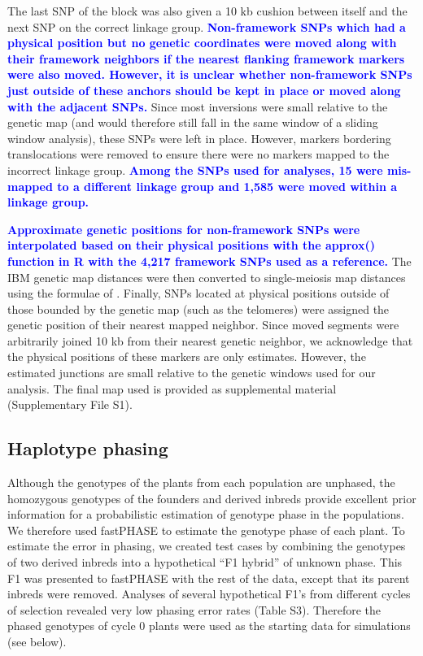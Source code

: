 \documentclass[twocolumn,twoside,letterpaper]{article}
\newcommand{\jpg}[1]{\todo[size=\scriptsize, color=gerkegreen]{#1}}
\newcommand{\rev}[1]{\textcolor{blue}{\bf #1}}
\begin{document}
The last SNP of the block was also given a 10 kb cushion between itself and the next SNP on the correct linkage group. 
\rev{Non-framework SNPs which had a physical position but no genetic coordinates were moved along with their framework neighbors if the nearest flanking framework markers were also moved.
However, it is unclear whether non-framework SNPs just outside of these anchors should be kept in place or moved along with the adjacent SNPs.} 
Since most inversions were small relative to the genetic map (and would therefore still fall in the same window of a sliding window analysis), these SNPs were left in place. 
However, markers bordering translocations were removed to ensure there were no markers mapped to the incorrect linkage group. 
\rev{Among the SNPs used for analyses, 15 were mis-mapped to a different linkage group and 1,585 were moved within a linkage group.}

\rev{Approximate genetic positions for non-framework SNPs were interpolated based on their physical positions with the approx() function in R \citep{rteam} with the 4,217 framework SNPs used as a reference.}
The IBM genetic map distances were then converted to single-meiosis map distances using the formulae of \citet{winkler2003determination}. 
Finally, SNPs located at physical positions outside of those bounded by the genetic map (such as the telomeres) were assigned the genetic position of their nearest mapped neighbor. 
Since moved segments were arbitrarily joined 10 kb from their nearest genetic neighbor, we acknowledge that the physical positions of these markers are only estimates. 
However, the estimated junctions are small relative to the genetic windows used for our analysis. 
The final map used is provided as supplemental material (Supplementary File S1).
	
\subsection*{Haplotype phasing}
Although the genotypes of the plants from each population are unphased, the homozygous genotypes of the founders and derived inbreds provide excellent prior information for a probabilistic estimation of genotype phase in the populations. 
We therefore used fastPHASE \citep{scheet2006fast} to estimate the genotype phase of each plant. To estimate the error in phasing, we created test cases by combining the genotypes of two derived inbreds into a hypothetical “F1 hybrid” of unknown phase. 
This F1 was presented to fastPHASE with the rest of the data, except that its parent inbreds were removed. 
Analyses of several hypothetical F1’s from different cycles of selection revealed very low phasing error rates (Table S3).  \jpg{S2 now?}
Therefore the phased genotypes of cycle 0 plants were used as the starting data for simulations (see below).
\end{document}
